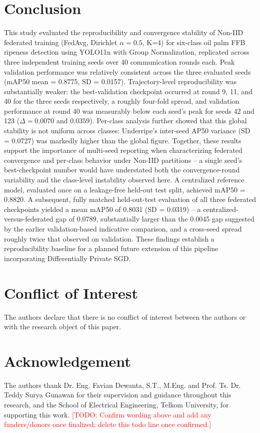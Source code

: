 \documentclass[11pt]{article}
\newcommand{\todo}[1]{\textcolor{red}{[TODO: #1]}}
\begin{document}
\section{Conclusion}

This study evaluated the reproducibility and convergence stability of Non-IID federated training (FedAvg, Dirichlet $\alpha=0.5$, K=4) for six-class oil palm FFB ripeness detection using YOLO11n with Group Normalization, replicated across three independent training seeds over 40 communication rounds each. Peak validation performance was relatively consistent across the three evaluated seeds (mAP50 mean = 0.8775, SD = 0.0157). Trajectory-level reproducibility was substantially weaker: the best-validation checkpoint occurred at round 9, 11, and 40 for the three seeds respectively, a roughly four-fold spread, and validation performance at round 40 was measurably below each seed's peak for seeds 42 and 123 ($\Delta=0.0070$ and $0.0359$). Per-class analysis further showed that this global stability is not uniform across classes: Underripe's inter-seed AP50 variance (SD = 0.0727) was markedly higher than the global figure. Together, these results support the importance of multi-seed reporting when characterizing federated convergence and per-class behavior under Non-IID partitions -- a single seed's best-checkpoint number would have understated both the convergence-round variability and the class-level instability observed here. A centralized reference model, evaluated once on a leakage-free held-out test split, achieved mAP50 = 0.8820. A subsequent, fully matched held-out-test evaluation of all three federated checkpoints yielded a mean mAP50 of 0.8031 (SD = 0.0319) -- a centralized-versus-federated gap of 0.0789, substantially larger than the 0.0045 gap suggested by the earlier validation-based indicative comparison, and a cross-seed spread roughly twice that observed on validation. These findings establish a reproducibility baseline for a planned future extension of this pipeline incorporating Differentially Private SGD.

\section*{Conflict of Interest}
The authors declare that there is no conflict of interest between the authors or with the research object of this paper.

\section*{Acknowledgement}
The authors thank Dr. Eng. Favian Dewanta, S.T., M.Eng. and Prof. Ts. Dr. Teddy Surya Gunawan for their supervision and guidance throughout this research, and the School of Electrical Engineering, Telkom University, for supporting this work. \todo{Confirm wording above and add any funders/donors once finalized; delete this todo line once confirmed.}
\end{document}
